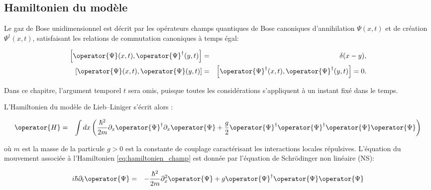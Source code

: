\subsection{Hamiltonien du modèle}

Le gaz de Bose unidimensionnel est décrit par les opérateurs champs quantiques de Bose canoniques  d'annihilation \( \Psi(x,t) \) et de création \( \Psi^\dag(x,t) \), satisfaisant les relations de commutation canoniques à temps égal:%

\begin{eqnarray}
\left[ \operator{\Psi}(x,t), \operator{\Psi}^\dag(y,t) \right] &=& \delta(x - y), \label{eq:CCR1} \\
\left[ \operator{\Psi}(x,t), \operator{\Psi}(y,t) \right] &=& \left[ \operator{\Psi}^\dag(x,t), \operator{\Psi}^\dag(y,t) \right] = 0. \label{eq:CCR2}
\end{eqnarray}






Dans ce chapitre, l’argument temporel \( t \) sera omis, puisque toutes les considérations s’appliquent à un instant fixé dans le temps.

L’Hamiltonien du modèle de Lieb–Liniger s’écrit alors :

\begin{eqnarray*}
	\operator{H} & = & \int dx \left( \frac{\hbar^2}{2m} \partial_x \operator{\Psi}^\dagger \partial_x \operator{\Psi} + \frac{g}2  \operator{\Psi}^\dagger \operator{\Psi}^\dagger \operator{\Psi} \operator{\Psi} \right)	
\end{eqnarray*}


où \( m \) est la masse de la particule \( g > 0\) est la constante de couplage caractérisant les interactions locales répulsives.  L’équation du mouvement associée à l’Hamiltonien \eqref{eq:hamiltonien_champ} est donnée par l’équation de Schrödinger non linéaire (NS): 

\begin{eqnarray*}
	i\hbar \partial_t \operator{\Psi}  & = & -\frac{\hbar^2}{2m} \partial^2_x  \operator{\Psi}  + g 	\operator{\Psi}^\dag \operator{\Psi} \operator{\Psi}
\end{eqnarray*}

